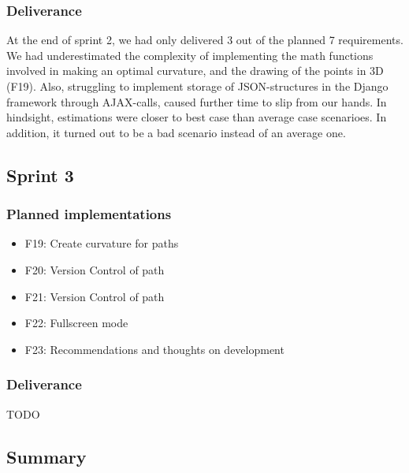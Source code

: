 \documentclass{report}
\begin{document}
\subsubsection{Deliverance}
At the end of sprint 2, we had only delivered 3 out of the planned 7 requirements. We had underestimated the complexity of implementing the math functions involved in making an optimal curvature, and the drawing of the points in 3D (F19). Also, struggling to implement storage of JSON-structures in the Django framework through AJAX-calls, caused further time to slip from our hands. In hindsight, estimations were closer to best case than average case scenarioes. In addition, it turned out to be a bad scenario instead of an average one.

\subsection{Sprint 3} \label{sec:sprint3_requirementsevolution}

\subsubsection{Planned implementations}

\begin{itemize}
    \item F19: Create curvature for paths
    \item F20: Version Control of path
    \item F21: Version Control of path
    \item F22: Fullscreen mode
    \item F23: Recommendations and thoughts on development
\end{itemize}

\subsubsection{Deliverance}
TODO

\subsection{Summary} \label{sec:requirements_evolution_summary}
\end{document}
